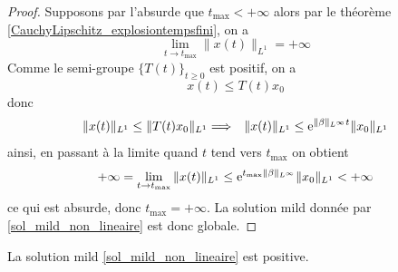 \begin{proof}
    Supposons par l'absurde que $t_{\max} <+\infty$ alors par le théorème \ref{CauchyLipschitz_explosiontempsfini}, on a 
    \begin{equation*}
        \lim_{t \to t_{\max}}\|x(t)\|_{L^1}=+\infty
    \end{equation*}
    Comme le semi-groupe $\big\{T(t)\big\}_{t \geq 0}$ est positif, on a 
    \begin{equation*}
        x(t) \leq T(t)x_0
    \end{equation*}
    donc 
    \begin{eqnarray*}
        \|x(t)\|_{L^1} \leq \|T(t)x_0\|_{L^1} &\Longrightarrow& \|x(t)\|_{L^1} \leq \mathrm{e}^{\|\beta\|_{L^\infty}t}\|x_0\|_{L^1}
    \end{eqnarray*}
    ainsi, en passant à la limite quand $t$ tend vers $t_{\max}$ on obtient 
    \begin{equation*}
        +\infty = \lim_{t \to t_{\max}} \|x(t)\|_{L^1} \leq \mathrm{e}^{t_{\max}\|\beta\|_{L^\infty}}\|x_0\|_{L^1}<+\infty
    \end{equation*}
    ce qui est absurde, donc $t_{\max}=+\infty$. La solution mild donnée par \eqref{sol_mild_non_lineaire} est donc globale.
\end{proof}

\begin{proposition}
    La solution mild \eqref{sol_mild_non_lineaire} est positive.
\end{proposition}

